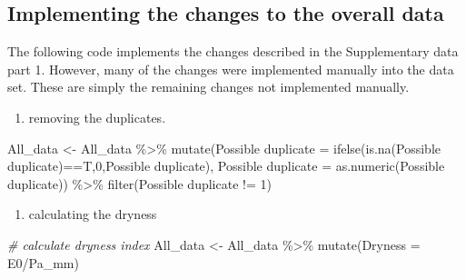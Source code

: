 \documentclass[]{elsarticle} %
\newenvironment{Shaded}{\begin{snugshade}}{\end{snugshade}}
\newcommand{\AttributeTok}[1]{\textcolor[rgb]{0.77,0.63,0.00}{#1}}
\newcommand{\CommentTok}[1]{\textcolor[rgb]{0.56,0.35,0.01}{\textit{#1}}}
\newcommand{\DecValTok}[1]{\textcolor[rgb]{0.00,0.00,0.81}{#1}}
\newcommand{\FunctionTok}[1]{\textcolor[rgb]{0.00,0.00,0.00}{#1}}
\newcommand{\NormalTok}[1]{#1}
\newcommand{\OtherTok}[1]{\textcolor[rgb]{0.56,0.35,0.01}{#1}}
\newcommand{\SpecialCharTok}[1]{\textcolor[rgb]{0.00,0.00,0.00}{#1}}
\newcommand{\StringTok}[1]{\textcolor[rgb]{0.31,0.60,0.02}{#1}}
\providecommand{\tightlist}{%
  \setlength{\itemsep}{0pt}\setlength{\parskip}{0pt}}
\begin{document}
\hypertarget{implementing-the-changes-to-the-overall-data}{%
\subsection{Implementing the changes to the overall data}\label{implementing-the-changes-to-the-overall-data}}

The following code implements the changes described in the Supplementary data part 1. However, many of the changes were implemented manually into the data set. These are simply the remaining changes not implemented manually.

\begin{enumerate}
\def\labelenumi{\arabic{enumi}.}
\tightlist
\item
  removing the duplicates.
\end{enumerate}

\begin{Shaded}
\begin{Highlighting}[]
\NormalTok{All\_data }\OtherTok{\textless{}{-}}\NormalTok{ All\_data }\SpecialCharTok{\%\textgreater{}\%}
  \FunctionTok{mutate}\NormalTok{(}\StringTok{\textasciigrave{}}\AttributeTok{Possible duplicate}\StringTok{\textasciigrave{}} \OtherTok{=} 
           \FunctionTok{ifelse}\NormalTok{(}\FunctionTok{is.na}\NormalTok{(}\StringTok{\textasciigrave{}}\AttributeTok{Possible duplicate}\StringTok{\textasciigrave{}}\NormalTok{)}\SpecialCharTok{==}\NormalTok{T,}\DecValTok{0}\NormalTok{,}\StringTok{\textasciigrave{}}\AttributeTok{Possible duplicate}\StringTok{\textasciigrave{}}\NormalTok{),}
         \StringTok{\textasciigrave{}}\AttributeTok{Possible duplicate}\StringTok{\textasciigrave{}} \OtherTok{=} \FunctionTok{as.numeric}\NormalTok{(}\StringTok{\textasciigrave{}}\AttributeTok{Possible duplicate}\StringTok{\textasciigrave{}}\NormalTok{)) }\SpecialCharTok{\%\textgreater{}\%}
  \FunctionTok{filter}\NormalTok{(}\StringTok{\textasciigrave{}}\AttributeTok{Possible duplicate}\StringTok{\textasciigrave{}} \SpecialCharTok{!=} \DecValTok{1}\NormalTok{)}
\end{Highlighting}
\end{Shaded}

\begin{enumerate}
\def\labelenumi{\arabic{enumi}.}
\setcounter{enumi}{1}
\tightlist
\item
  calculating the dryness
\end{enumerate}

\begin{Shaded}
\begin{Highlighting}[]
\CommentTok{\# calculate dryness index}
\NormalTok{All\_data }\OtherTok{\textless{}{-}}\NormalTok{ All\_data }\SpecialCharTok{\%\textgreater{}\%}
  \FunctionTok{mutate}\NormalTok{(}\AttributeTok{Dryness =}\NormalTok{ E0}\SpecialCharTok{/}\NormalTok{Pa\_mm)}
\end{Highlighting}
\end{Shaded}
\end{document}

